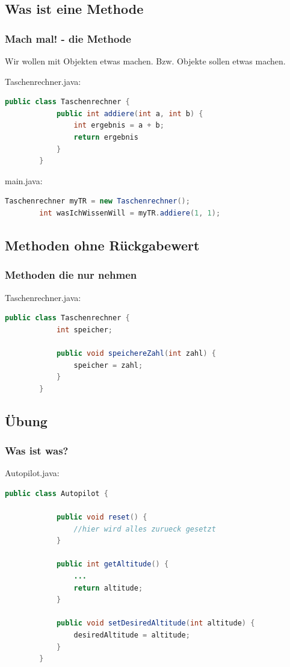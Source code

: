 \documentclass[18pt]{beamer}
\begin{document}
\subsection{Was ist eine Methode}
\begin{frame}[fragile]
	\frametitle{Mach mal! - die Methode}
	
	Wir wollen mit Objekten etwas machen. Bzw. Objekte sollen etwas machen.
	
	
	\pause
	Taschenrechner.java:
	\begin{lstlisting}[language=java]
		public class Taschenrechner {
			public int addiere(int a, int b) {
				int ergebnis = a + b;
				return ergebnis
			}
		}
	\end{lstlisting}
	\pause
	
	
	main.java:
	\begin{lstlisting}[language=java]
		Taschenrechner myTR = new Taschenrechner();
		int wasIchWissenWill = myTR.addiere(1, 1);
	\end{lstlisting}
\end{frame}


\subsection{Methoden ohne Rückgabewert}
\begin{frame}[fragile]
	\frametitle{Methoden die nur nehmen}
	Taschenrechner.java:
	\begin{lstlisting}[language=java]
		public class Taschenrechner {
			int speicher;
			
			public void speichereZahl(int zahl) {
				speicher = zahl;
			}
		}
	\end{lstlisting}
\end{frame}


\subsection{Übung}
\begin{frame}[fragile]
	\frametitle{Was ist was?}
	Autopilot.java:
	\begin{lstlisting}[language=java]
		public class Autopilot {
			
			public void reset() {
				//hier wird alles zurueck gesetzt
			}
			
			public int getAltitude() {
				...
				return altitude;
			}
			
			public void setDesiredAltitude(int altitude) {
				desiredAltitude = altitude;
			}
		}
	\end{lstlisting}
\end{frame}
\end{document}
